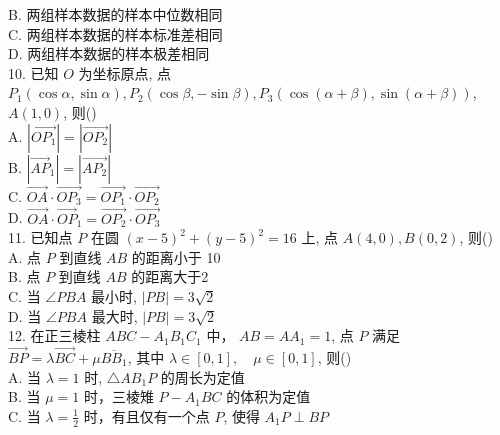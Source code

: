 \documentclass[UTF8]{ctexart}
\begin{document}
	B. 两组样本数据的样本中位数相同\\
	
	C. 两组样本数据的样本标准差相同\\
	
	D. 两组样本数据的样本极差相同\\
	
	10. 已知 $O$ 为坐标原点, 点 $P_{1}(\cos \alpha, \sin \alpha), P_{2}(\cos \beta,-\sin \beta), P_{3}(\cos (\alpha+\beta), \sin (\alpha+\beta))$,
	$A(1,0)$, 则(\qquad)\\
	
	A. $\left|\overrightarrow{O P_{1}}\right|=\left|\overrightarrow{O P_{2}}\right|$\\
	
	B. $\left|\overrightarrow{A P}_{1}\right|=\left|\overrightarrow{A P_{2}}\right|$\\
	
	C. $\overrightarrow{O A} \cdot \overrightarrow{O P_{3}}=\overrightarrow{O P_{1}} \cdot \overrightarrow{O P_{2}}$\\
	
	D. $\overrightarrow{O A} \cdot \overrightarrow{O P}_{1}=\overrightarrow{O P_{2}} \cdot \overrightarrow{O P_{3}}$\\
	
	11. 已知点 $P$ 在圆 $(x-5)^{2}+(y-5)^{2}=16$ 上, 点 $A(4,0), B(0,2)$, 则(\qquad)\\
	
	A. 点 $P$ 到直线 $A B$ 的距离小于 10\\
	
	B. 点 $P$ 到直线 $A B$ 的距离大于2\\
	
	C. 当 $\angle P B A$ 最小时, $|P B|=3 \sqrt{2}$\\
	
	D. 当 $\angle P B A$ 最大时, $|P B|=3 \sqrt{2}$\\
	
	12. 在正三棱柱 $A B C-A_{1} B_{1} C_{1}$ 中， $A B=A A_{1}=1$, 点 $P$ 满足 $\overrightarrow{B P}=\lambda \overrightarrow{B C}+\mu \overline{B B_{1}}$, 其中
	$\lambda \in[0,1], \quad \mu \in[0,1]$, 则(\qquad)\\
	
	A. 当 $\lambda=1$ 时, $\triangle A B_{1} P$ 的周长为定值\\
	
	B. 当 $\mu=1$ 时，三棱雉 $P-A_{1} B C$ 的体积为定值\\
	
	C. 当 $\lambda=\frac{1}{2}$ 时，有且仅有一个点 $P$, 使得 $A_{1} P \perp B P$\\
	
\end{document}
